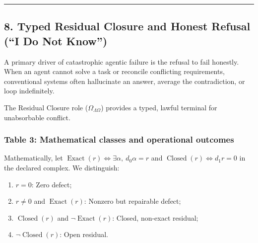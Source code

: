 \documentclass[
  10pt,
]{article}
\begin{document}
\begin{center}\rule{0.5\linewidth}{0.5pt}\end{center}

\subsection{8. Typed Residual Closure and Honest Refusal (``I Do Not Know'')}\label{typed-residual-closure-and-honest-refusal-i-do-not-know}

A primary driver of catastrophic agentic failure is the refusal to fail honestly. When an agent cannot solve a task or reconcile conflicting requirements, conventional systems often hallucinate an answer, average the contradiction, or loop indefinitely.

The Residual Closure role (\hypertarget{math-E0028-0184}{}{\(\Omega_{\Lambda\Omega}\)}) provides a typed, lawful terminal for unabsorbable conflict.

\subsubsection{Table 3: Mathematical classes and operational outcomes}\label{table-3-mathematical-classes-and-operational-outcomes}

Mathematically, let \hypertarget{math-E0134-0185}{}{\(\operatorname{Exact}(r) \iff \exists\alpha,\ d_0\alpha = r\)} and \hypertarget{math-E0135-0186}{}{\(\operatorname{Closed}(r) \iff d_1 r = 0\)} in the declared complex. We distinguish:

\begin{enumerate}
\def\labelenumi{\arabic{enumi}.}
\item
  \hypertarget{math-E0015-0187}{}{\(r = 0\)}: Zero defect;
\item
  \hypertarget{math-E0136-0188}{}{\(r \neq 0\)} and \hypertarget{math-E0137-0189}{}{\(\operatorname{Exact}(r)\)}: Nonzero but repairable defect;
\item
  \hypertarget{math-E0138-0190}{}{\(\operatorname{Closed}(r)\)} and \hypertarget{math-E0139-0191}{}{\(\neg\operatorname{Exact}(r)\)}: Closed, non-exact residual;
\item
  \hypertarget{math-E0140-0192}{}{\(\neg\operatorname{Closed}(r)\)}: Open residual.
\end{enumerate}
\end{document}
